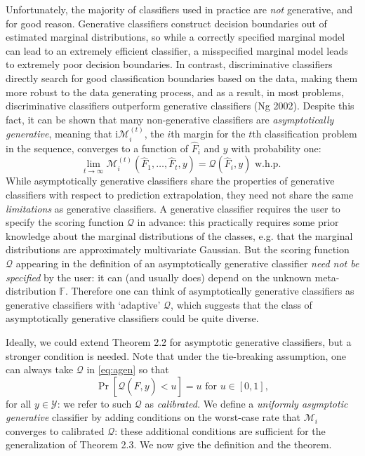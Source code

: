 \documentclass{article}
\begin{document}
Unfortunately, the majority of classifiers used in practice are \emph{not} generative,
and for good reason.  Generative classifiers construct decision boundaries out of estimated marginal distributions,
so while a correctly specified marginal model can lead to an extremely efficient classifier,
a misspecified marginal model leads to extremely poor decision boundaries.
In contrast, discriminative classifiers directly search for good classification boundaries based on the data,
making them more robust to the data generating process, and as a result,
in most problems, discriminative classifiers outperform generative classifiers (Ng 2002).
Despite this fact, it can be shown that many non-generative classifiers are \emph{asymptotically generative},
meaning that i$\mathcal{M}_i^{(t)}$, the $i$th margin for the $t$th classification problem in the sequence,
converges to a function of $\hat{F}_i$ and $y$ with probability one:
\begin{equation}\label{eq:agen}
\lim_{t \to \infty} \mathcal{M}_i^{(t)}(\hat{F}_1,\hdots, \hat{F}_t, y) = \mathcal{Q}(\hat{F}_i, y) \text{ w.h.p. }
\end{equation}
While asymptotically generative classifiers share the properties of generative classifiers with respect to
prediction extrapolation, they need not share the same \emph{limitations} as generative classifiers.
A generative classifier requires the user to specify the scoring function $\mathcal{Q}$ in advance:
this practically requires some prior knowledge about the marginal distributions of the classes,
e.g. that the marginal distributions are approximately multivariate Gaussian.
But the scoring function $\mathcal{Q}$ appearing in the definition of an asymptotically generative classifier
\emph{need not be specified} by the user: 
it can (and usually does) depend on the unknown meta-distribution $\mathbb{F}$.
Therefore one can think of asymptotically generative classifiers as generative classifiers with `adaptive' $\mathcal{Q}$,
which suggests that the class of asymptotically generative classifiers could be quite diverse.

Ideally, we could extend Theorem 2.2 for asymptotic generative classifiers, but a stronger condition is needed.
Note that under the tie-breaking assumption, one can always take $\mathcal{Q}$ in \eqref{eq:agen} so that
\[
\Pr[\mathcal{Q}(\hat{F}, y) < u] = u\text{ for }u \in [0,1],
\]
for all $y \in \mathcal{Y}$: we refer to such $\mathcal{Q}$ as \emph{calibrated.}
We define a \emph{uniformly asymptotic generative} classifier by adding conditions on the worst-case rate that
$\mathcal{M}_i$ converges to calibrated $\mathcal{Q}$: these additional conditions are sufficient for the generalization of Theorem 2.3.  We now give the definition and the theorem.
\end{document}
